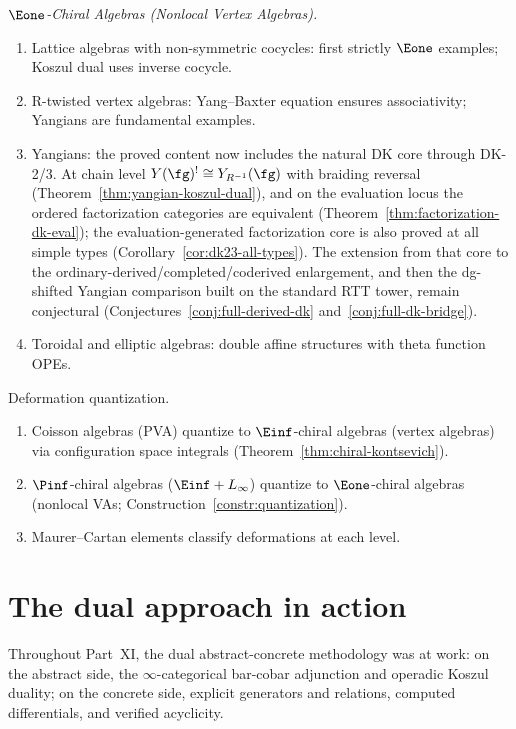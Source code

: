 \emph{$\Eone$-Chiral Algebras (Nonlocal Vertex Algebras).}
\begin{enumerate}[label=(\roman*)]
\item Lattice algebras with non-symmetric cocycles: first strictly $\Eone$ examples;
Koszul dual uses inverse cocycle.
\item R-twisted vertex algebras: Yang--Baxter equation ensures associativity;
Yangians are fundamental examples.
\item Yangians: the proved content now includes the natural DK core
  through DK-2/3.  At chain level
  $Y(\fg)^! \cong Y_{R^{-1}}(\fg)$ with braiding reversal
  \textup{(}Theorem~\ref{thm:yangian-koszul-dual}\textup{)}, and on the
  evaluation locus the ordered factorization categories are equivalent
  \textup{(}Theorem~\ref{thm:factorization-dk-eval}\textup{)}; the
  evaluation-generated factorization core is also proved at all simple
  types \textup{(}Corollary~\ref{cor:dk23-all-types}\textup{)}.  The
  extension from that core to the
  ordinary-derived/completed/coderived enlargement, and then the
  dg-shifted Yangian comparison built on the standard RTT tower,
  remain conjectural
  \textup{(}Conjectures~\ref{conj:full-derived-dk}
  and~\ref{conj:full-dk-bridge}\textup{)}.
\item Toroidal and elliptic algebras: double affine structures with theta function OPEs.
\end{enumerate}

Deformation quantization.
\begin{enumerate}[label=(\roman*)]
\item Coisson algebras (PVA) quantize to $\Einf$-chiral algebras (vertex algebras)
via configuration space integrals (Theorem~\ref{thm:chiral-kontsevich}).
\item $\Pinf$-chiral algebras ($\Einf + L_\infty$) quantize to $\Eone$-chiral
algebras (nonlocal VAs; Construction~\ref{constr:quantization}).
\item Maurer--Cartan elements classify deformations at each level.
\end{enumerate}

\section*{The dual approach in action}

Throughout Part~XI, the dual abstract-concrete methodology was at work: on the abstract side, the $\infty$-categorical bar-cobar adjunction and operadic Koszul duality; on the concrete side, explicit generators and relations, computed differentials, and verified acyclicity.

